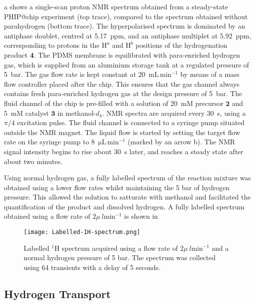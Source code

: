 a shows a single-scan proton NMR spectrum
obtained from a steady-state PHIP@chip experiment (top trace), compared
to the spectrum obtained without parahydrogen (bottom trace).
The hyperpolarised spectrum is dominated by an antiphase doublet,
centred at 5.17~ppm, and an antiphase multiplet at 5.92~ppm, corresponding to
protons in the $\mathrm{H}^a$ and $\mathrm{H}^b$ positions of the
hydrogenation product \textbf{4}.
The PDMS membrane is equilibrated with para-enriched hydrogen gas, which is
supplied from an aluminium storage tank at a regulated pressure of 5~bar. The
gas flow rate is kept constant at 20~$\text{mL}\,\text{min}^{-1}$ by means of a
mass flow controller placed after the chip. This ensures that the gas channel
always contains fresh para-enriched hydrogen gas at the design pressure of
5~bar. The fluid channel of the chip is pre-filled with a solution of 20~mM
precursor $\mathbf{2}$ and 5~mM catalyst $\mathbf{3}$ in methanol-$d_4$. NMR
spectra are acquired every 30~s, using a $\pi/4$ excitation pulse.  The fluid
channel is connected to a syringe pump situated outside the NMR magnet.
The
liquid flow is started by setting the target flow rate on the syringe pump to
8~$\mathrm{\mu L\,\text{min}^{-1}}$ (marked by an arrow b).
The NMR signal intensity begins to rise about 30~s later, and reaches a steady
state after about two minutes.

Using normal hydrogen gas, a fully labelled spectrum of the reaction mixture
was obtained using a lower flow rates whilst maintaining
the 5 bar of hydrogen pressure. This allowed the solution to satturate with
methanol and facilitated the quantification of the product and dissolved hydrogen.
A fully labelled spectrum obtained using a flow rate of 2$\mu~l \text{min}^{-1}$
is shown in 

\begin{figure}
  \begin{center}
  \texttt{[image: Labelled-1H-spectrum.png]}
  \end{center}
  \caption{Labelled $^1$H spectrum acquired using a flow rate of 2$\mu~l \text{min}^{-1}$
  and a normal hydrogen pressure of 5 bar. The spectrum was collected using 64 transients
  with a delay of 5 seconds.}
  \label{fig:LabelledSpec}
\end{figure}

\subsection{Hydrogen Transport}

